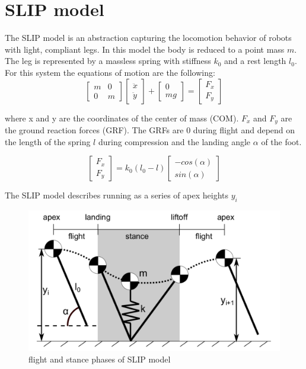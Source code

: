 \documentclass[10pt, conference]{IEEEtran}
\begin{document}
\section{SLIP model}
The SLIP model is an abstraction capturing the locomotion behavior of robots with light, compliant legs. In this model the body is reduced to a point mass \( m \). The
leg is represented by a massless spring with stiffness \({k}_0 \) and a rest length \({l}_0 \). For this system the equations of motion are the following:
\begin{equation}
   \begin{bmatrix} m & 0 \\ 0 & m \end{bmatrix}
   \begin{bmatrix} \ddot{x} \\ \ddot{y} \end{bmatrix}
   +
   \begin{bmatrix} 0 \\ mg \end{bmatrix}
   =
   \begin{bmatrix} {F}_{x} \\ {F}_{y} \end{bmatrix}
\end{equation}

where x and y are the coordinates of the center of mass (COM). \({F}_x \) and \({F}_y \) are the ground reaction forces (GRF). The GRFs are 0 during flight and depend 
on the length of the spring \(l\) during compression and the landing angle \(\alpha\) of the foot.

\begin{equation}
   \begin{bmatrix} {F}_{x}  \\ {F}_{y}  \end{bmatrix}
   =
   {k}_{0} ({l}_{0} -l)
   \begin{bmatrix} -cos(\alpha) \\ sin(\alpha) \end{bmatrix}
\end{equation}

The SLIP model describes running as a series of apex heights \({y}_i \)

\begin{figure}[h]
   \centering
   \includegraphics[scale=0.2]{"assets/SMM2.pdf"}
   \caption{flight and stance phases of SLIP model \cite{Wu2014}}
   \label{fig_SLIP_phase}
\end{figure}
\end{document}
